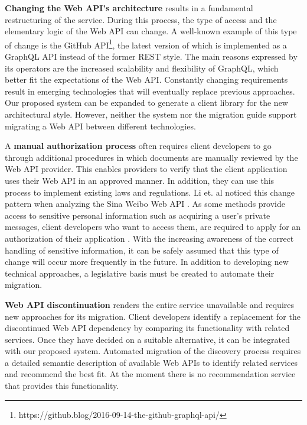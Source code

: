 \vspace{0.25cm}
\textbf{Changing the Web API's architecture} results in a fundamental restructuring of the service. During this process, the type of access and the elementary logic of the Web API can change. A well-known example of this type of change is the GitHub API\footnote{https://github.blog/2016-09-14-the-github-graphql-api/}, the latest version of which is implemented as a GraphQL API instead of the former REST style. The main reasons expressed by its operators are the increased scalability and flexibility of GraphQL, which better fit the expectations of the Web API. Constantly changing requirements result in emerging technologies that will eventually replace previous approaches. Our proposed system can be expanded to generate a client library for the new architectural style. However, neither the system nor the migration guide support migrating a Web API between different technologies.

A \textbf{manual authorization process} often requires client developers to go through additional procedures in which documents are manually reviewed by the Web API provider. This enables providers to verify that the client application uses their Web API in an approved manner. In addition, they can use this process to implement existing laws and regulations. Li et. al noticed this change pattern when analyzing the Sina Weibo Web API \cite{li_how_2013}. As some methods provide access to sensitive personal information such as acquiring a user's private messages, client developers who want to access them, are required to apply for an authorization of their application \cite{li_how_2013}. With the increasing awareness of the correct handling of sensitive information, it can be safely assumed that this type of change will occur more frequently in the future. In addition to developing new technical approaches, a legislative basis must be created to automate their migration. 

\textbf{Web API discontinuation} renders the entire service unavailable and requires new approaches for its migration. Client developers identify a replacement for the discontinued Web API dependency by comparing its functionality with related services. Once they have decided on a suitable alternative, it can be integrated with our proposed system. Automated migration of the discovery process requires a detailed semantic description of available Web APIs to identify related services and recommend the best fit. At the moment there is no recommendation service that provides this functionality.

